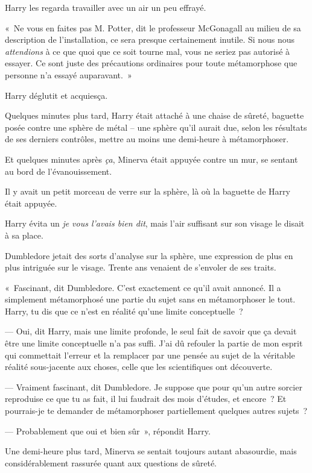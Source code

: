 Harry les regarda travailler avec un air un peu effrayé.

«~Ne vous en faites pas M. Potter, dit le professeur McGonagall au milieu de sa description de l'installation, ce sera presque certainement inutile. Si nous nous \emph{attendions} à ce que quoi que ce soit tourne mal, vous ne seriez pas autorisé à essayer. Ce sont juste des précautions ordinaires pour toute métamorphose que personne n'a essayé auparavant.~»

Harry déglutit et acquiesça.

Quelques minutes plus tard, Harry était attaché à une chaise de sûreté, baguette posée contre une sphère de métal -- une sphère qu'il aurait due, selon les résultats de ses derniers contrôles, mettre au moins une demi-heure à métamorphoser.

Et quelques minutes après \emph{ça}, Minerva était appuyée contre un mur, se sentant au bord de l'évanouissement.

Il y avait un petit morceau de verre sur la sphère, là où la baguette de Harry était appuyée.

Harry évita un \emph{je vous l'avais bien dit}, mais l'air suffisant sur son visage le disait à sa place.

Dumbledore jetait des sorts d'analyse sur la sphère, une expression de plus en plus intriguée sur le visage. Trente ans venaient de s'envoler de ses traits.

«~Fascinant, dit Dumbledore. C'est exactement ce qu'il avait annoncé. Il a simplement métamorphosé une partie du sujet sans en métamorphoser le tout. Harry, tu dis que ce n'est en réalité qu'une limite conceptuelle~?

--- Oui, dit Harry, mais une limite profonde, le seul fait de savoir que ça devait être une limite conceptuelle n'a pas suffi. J'ai dû refouler la partie de mon esprit qui commettait l'erreur et la remplacer par une pensée au sujet de la véritable réalité sous-jacente aux choses, celle que les scientifiques ont découverte.

--- Vraiment fascinant, dit Dumbledore. Je suppose que pour qu'un autre sorcier reproduise ce que tu as fait, il lui faudrait des mois d'études, et encore~? Et pourrais-je te demander de métamorphoser partiellement quelques autres sujets~?

--- Probablement que oui et bien sûr~», répondit Harry.

Une demi-heure plus tard, Minerva se sentait toujours autant abasourdie, mais considérablement rassurée quant aux questions de sûreté.

